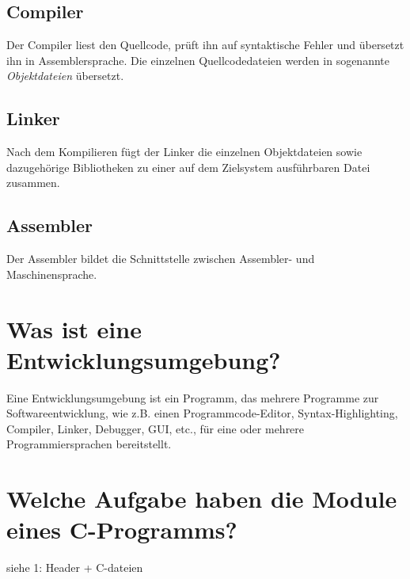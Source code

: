 \documentclass[a4paper, 12pt]{article}
\begin{document}
  \subsection{Compiler}
  Der Compiler liest den Quellcode, prüft ihn auf syntaktische Fehler und
  übersetzt ihn in Assemblersprache. Die einzelnen
  Quellcodedateien werden in sogenannte \emph{Objektdateien} übersetzt.

  \subsection{Linker}
  Nach dem Kompilieren fügt der Linker die einzelnen Objektdateien sowie
  dazugehörige Bibliotheken zu einer auf
  dem Zielsystem ausführbaren Datei zusammen.

  \subsection{Assembler}
  Der Assembler bildet die Schnittstelle zwischen Assembler- und Maschinensprache.

  \section{Was ist eine Entwicklungsumgebung?}
  Eine Entwicklungsumgebung ist ein Programm, das mehrere Programme zur
  Softwareentwicklung, wie z.B. einen Programmcode-Editor, Syntax-Highlighting,
  Compiler, Linker, Debugger, GUI, etc., für eine oder mehrere Programmiersprachen bereitstellt.

  \section{Welche Aufgabe haben die Module eines C-Programms?}
  siehe 1: Header + C-dateien
  
\end{document}
